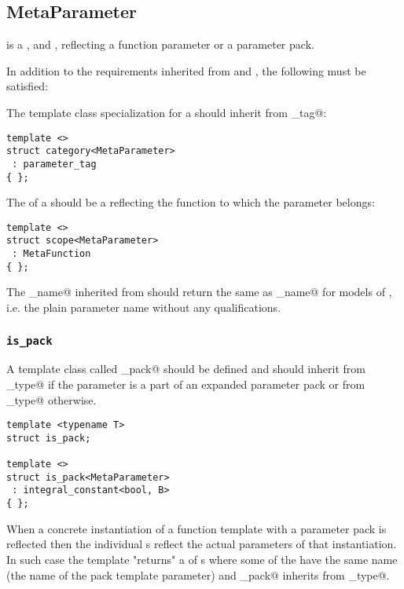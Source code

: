 \subsection{MetaParameter}
\label{concept-MetaParameter}

 is a ,  and ,
reflecting a function parameter or a parameter pack.

In addition to the requirements inherited from  and ,
the following must be satisfied:

The \verb@category@ template class specialization for a  should
inherit from \verb@parameter_tag@:

\begin{verbatim}
template <>
struct category<MetaParameter>
 : parameter_tag
{ };
\end{verbatim}

The \verb@scope@ of a  should be a  reflecting
the function to which the parameter belongs:

\begin{verbatim}
template <>
struct scope<MetaParameter>
 : MetaFunction
{ };
\end{verbatim}

The \verb@full_name@ inherited from  should return the same 
as \verb@base_name@ for models of , i.e. the plain parameter
name without any qualifications.

\subsubsection{\texttt{is\_pack}}

A template class called \verb@is_pack@ should be defined and should
inherit from \verb@true_type@ if the parameter is a part of an expanded
parameter pack or from \verb@false_type@ otherwise.

\begin{verbatim}
template <typename T>
struct is_pack;

template <>
struct is_pack<MetaParameter>
 : integral_constant<bool, B>
{ };
\end{verbatim}

When a concrete instantiation of a function template with a parameter pack
is reflected then the individual s reflect the actual parameters
of that instantiation. In such case the \verb@parameters@ template "returns"
a  of s where some of the 
have the same name (the name of the pack template parameter)
and \verb@is_pack@ inherits from \verb@true_type@.

